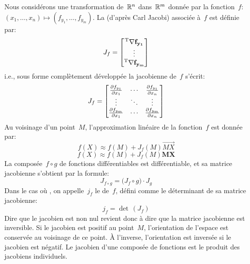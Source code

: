 Nous considérons une transformation de~$\mathbb R^n$ dans~$\mathbb R^m$ donnée par la fonction~$f$: 
$\left(x_1, \ldots, x_n \right) \mapsto \left(f_{y_1}, \ldots, f_{y_m} \right)$.
\medskipvm
La  (d'après Carl Jacobi) associée à~$f$ est définie par:
\begin{equation}
J_f = \MM*{\LL{\nabla f_{y_1}} \\ \vdots \\ \LL{\nabla f_{y_m}}}
\end{equation}
i.e., sous forme complètement développée la jacobienne de~$f$ s'écrit:
\begin{equation}
J_f = \MM*{\frac{\partial f_{y_1}}{\partial x_1} & \cdots & \frac{\partial f_{y_1}}{\partial x_n} \\ \vdots & \ddots & \vdots \\ \frac{\partial f_{y_m}}{\partial x_1} & \cdots & \frac{\partial f_{y_m}}{\partial x_n}}
\end{equation}
\medskipvm
Au voisinage d'un point~$M$, l'approximation linéaire de la fonction~$f$ est donnée par:
\ifVersionDuDocEstVincent
\begin{equation} f\left(X\right) \approx f\left(M\right) + J_f\left(M\right) \overrightarrow{MX}\end{equation}
\else
\begin{equation} f\left(X\right) \approx f\left(M\right) + J_f\left(M\right) \mathbf{MX}\end{equation}
\fi
\medskipvm
La composée~$f\circ g$ de fonctions différentiables est différentiable, et sa matrice jacobienne s'obtient par la formule:
\begin{equation} J_{f \circ g}= \bigl( J_f \circ g \bigr) \cdot J_g\end{equation}
\medskipvm
Dans le cas où , on appelle~$j_f$ le  de~$f$, 
défini comme le déterminant de sa matrice jacobienne: 
\begin{equation} j_f = \det\, \left(J_f \right) \end{equation}
Dire que le jacobien est non nul revient donc à dire que la matrice jacobienne est inversible.
\medskipvm
Si le jacobien est positif au point~$M$, l'orientation de l'espace est conservée au voisinage de ce point. À l'inverse, l'orientation est inversée si le jacobien est négatif.
\medskipvm
Le jacobien d'une composée de fonctions est le produit des jacobiens individuels.
